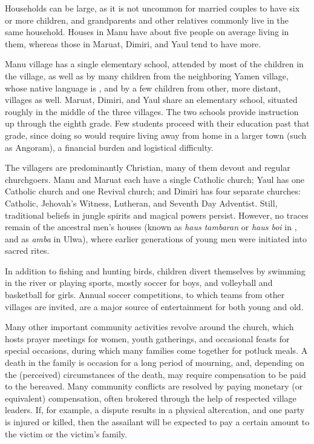 Households can be large, as it is not uncommon for married couples to have six or more children, and grandparents and other relatives commonly live in the same household. Houses in Manu have about five people on average living in them, whereas those in Maruat, Dimiri, and Yaul tend to have more.

Manu village has a single elementary school, attended by most of the children in the village, as well as by many children from the neighboring Yamen village, whose native language is , and by a few children from other, more distant, villages as well. Maruat, Dimiri, and Yaul share an elementary school, situated roughly in the middle of the three villages. The two schools provide instruction up through the eighth grade. Few students proceed with their education past that grade, since doing so would require living away from home in a larger town (such as Angoram), a financial burden and logistical difficulty.

The villagers are predominantly Christian, many of them devout and regular churchgoers. Manu and Maruat each have a single Catholic church; Yaul has one Catholic church and one Revival church; and Dimiri has four separate churches: Catholic, Jehovah’s Witness, Lutheran, and Seventh Day Adventist. Still, traditional beliefs in jungle spirits and magical powers persist. However, no traces remain of the ancestral men’s houses (known as \textit{haus tambaran} or \textit{haus boi} in , and as \textit{amba} in Ulwa), where earlier generations of young men were initiated into sacred rites.

In addition to fishing and hunting birds, children divert themselves by swimming in the river or playing sports, mostly soccer for boys, and volleyball and basketball for girls. Annual soccer competitions, to which teams from other villages are invited, are a major source of entertainment for both young and old.

Many other important community activities revolve around the church, which hosts prayer meetings for women, youth gatherings, and occasional feasts for special occasions, during which many families come together for potluck meals. A death in the family is occasion for a long period of mourning, and, depending on the (perceived) circumstances of the death, may require compensation to be paid to the bereaved. Many community conflicts are resolved by paying monetary (or equivalent) compensation, often brokered through the help of respected village leaders. If, for example, a dispute results in a physical altercation, and one party is injured or killed, then the assailant will be expected to pay a certain amount to the victim or the victim’s family.

